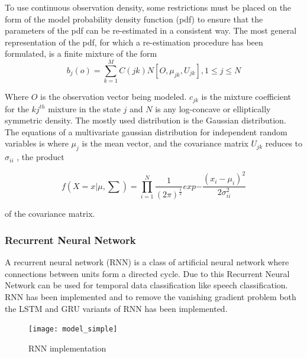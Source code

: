 To use continuous observation density, some restrictions must be placed on the form of the model probability density function (pdf) to ensure that the parameters of the pdf can be re-estimated in a consistent way. The most general representation of the pdf, for which a re-estimation procedure has been formulated, is a finite mixture of the form
\begin{equation} b_{j}(o) = \sum_{k=1}^{M}C(jk)N[O,\mu_{jk},U_{jk}] , 1 \leq j \leq N \end{equation}

Where $O$ is the observation vector being modeled. $c_{jk}$ is the mixture coefficient for the $kj^{th}$ mixture in the state $j$ and $N$ is any log-concave or elliptically symmetric density. The mostly used distribution is the Gaussian distribution. The equations of a multivariate gaussian distribution for independent random variables is where $\mu_{j}$ is the mean vector, and
the covariance matrix $U_{jk}$ reduces to $\sigma_{ii}$ , the product

\begin{equation} f(X=x|\mu,\textstyle \sum) = \prod_{i=1}^{N} \frac{1}{(2\pi)^{\frac{1}{2}}} exp {- \frac{(x_{i}-\mu_{i})^{2}}{2\sigma_{ii}^{2}}}  \end{equation}

of the covariance matrix.

\subsubsection{Recurrent Neural Network}

A recurrent neural network (RNN) is a class of artificial neural network where connections between units form a directed cycle. Due to this Recurrent Neural Network can be used for temporal data classification like speech classification. RNN has been implemented and to remove the vanishing gradient problem both the LSTM and GRU variants of RNN has been implemented.





\begin{figure}[h]
	\begin{center}
		\texttt{[image: model\_simple]}
		\caption{RNN implementation}
		\label{audacity}
	\end{center}
\end{figure}



